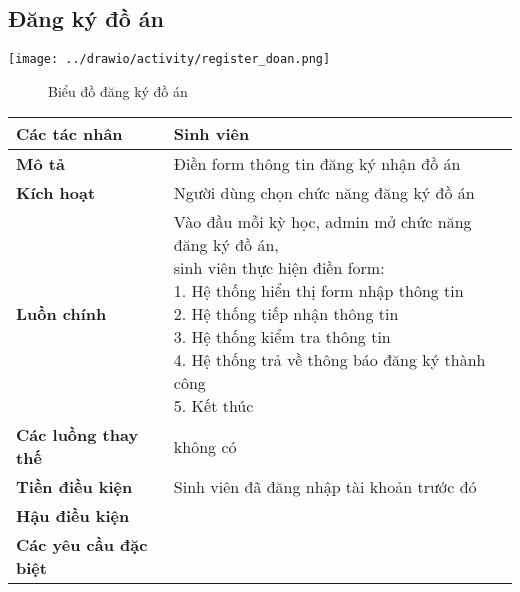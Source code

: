 \subsection{Đăng ký đồ án}
\begin{center}
	\texttt{[image: ../drawio/activity/register\_doan.png]}
	\begin{figure}[h]
		\centering
		\caption{Biểu đồ đăng ký đồ án}
	\end{figure}
\end{center}
\begin{tabular}{|l|p{}|}
	\hline
	\textbf{Các tác nhân}         & Sinh viên                                                                                         \\
	\hline
	\textbf{Mô tả}                & Điền form thông tin đăng ký nhận đồ án                                                            \\
	\hline
	\textbf{Kích hoạt}            & Người dùng chọn chức năng đăng ký đồ án                                                           \\
	\hline
	\textbf{Luồn chính}           & \makecell[l]{Vào đầu mỗi kỳ học, admin mở chức năng đăng ký đồ án, \\sinh viên thực hiện điền form: \\ 1. Hệ thống hiển thị form nhập thông tin \\ 2. Hệ thống tiếp nhận thông tin \\ 3. Hệ thống kiểm tra thông tin \\ 4. Hệ thống trả về thông báo đăng ký thành công \\ 5. Kết thúc} \\
	\hline
	\textbf{Các luồng thay thế}   & không có                                                                                          \\
	\hline
	\textbf{Tiền điều kiện}       & Sinh viên đã đăng nhập tài khoản trước đó                                                         \\
	\hline
	\textbf{Hậu điều kiện}        &                                                                                                   \\
	\hline
	\textbf{Các yêu cầu đặc biệt} &                                                                                                   \\
	\hline
\end{tabular}

